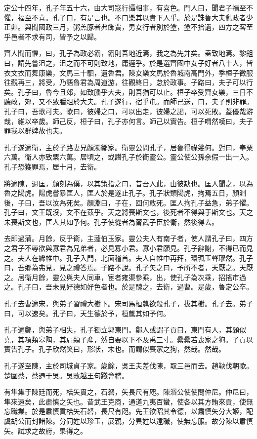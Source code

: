 定公十四年，孔子年五十六，由大司寇行攝相事，有喜色。門人曰，聞君子禍至不懼，福至不喜。孔子曰，有是言也。不曰樂其以貴下人乎。於是誅魯大夫亂政者少正卯。與聞國政三月，粥羔豚者弗飾賈，男女行者別於塗，塗不拾遺，四方之客至乎邑者不求有司，皆予之以歸。

齊人聞而懼，曰，孔子為政必霸，霸則吾地近焉，我之為先并矣。盍致地焉。黎鉏曰，請先嘗沮之，沮之而不可則致地，庸遲乎。於是選齊國中女子好者八十人，皆衣文衣而舞康樂，文馬三十駟，遺魯君。陳女樂文馬於魯城南高門外，季桓子微服往觀再三，將受，乃語魯君為周道游，往觀終日，怠於政事。子路曰，夫子可以行矣。孔子曰，魯今且郊，如致膰乎大夫，則吾猶可以止。桓子卒受齊女樂，三日不聽政，郊，又不致膰俎於大夫。孔子遂行，宿乎屯。而師己送，曰，夫子則非罪。孔子曰，吾歌可夫。歌曰，彼婦之口，可以出走，彼婦之謁，可以死敗。蓋優哉游哉，維以卒歲。師己反，桓子曰，孔子亦何言。師己以實告。桓子喟然嘆曰，夫子罪我以群婢故也夫。

孔子遂適衛，主於子路妻兄顏濁鄒家。衛靈公問孔子，居魯得祿幾何。對曰，奉粟六萬。衛人亦致粟六萬。居頃之，或譖孔子於衛靈公。靈公使公孫余假一出一入。孔子恐獲罪焉，居十月，去衛。

將適陳，過匡，顏刻為僕，以其策指之曰，昔吾入此，由彼缺也。匡人聞之，以為魯之陽虎。陽虎嘗暴匡人，匡人於是遂止孔子。孔子狀類陽虎，拘焉五日，顏淵後，子曰，吾以汝為死矣。顏淵曰，子在，回何敢死。匡人拘孔子益急，弟子懼。孔子曰，文王既沒，文不在茲乎。天之將喪斯文也，後死者不得與于斯文也。天之未喪斯文也，匡人其如予何。孔子使從者為甯武子臣於衛，然後得去。

去即過蒲。月餘，反乎衛，主蘧伯玉家。靈公夫人有南子者，使人謂孔子曰，四方之君子不辱欲與寡君為兄弟者，必見寡小君。寡小君願見。孔子辭謝，不得已而見之。夫人在絺帷中。孔子入門，北面稽首。夫人自帷中再拜，環珮玉聲璆然。孔子曰，吾鄉為弗見，見之禮答焉。子路不說。孔子矢之曰，予所不者，天厭之。天厭之。居衛月餘，靈公與夫人同車，宦者雍渠參乘，出，使孔子為次乘，招搖市過之。孔子曰，吾未見好德如好色者也。於是醜之，去衛，過曹。是歲，魯定公卒。

孔子去曹適宋，與弟子習禮大樹下。宋司馬桓魋欲殺孔子，拔其樹。孔子去。弟子曰，可以速矣。孔子曰，天生德於予，桓魋其如予何。

孔子適鄭，與弟子相失，孔子獨立郭東門。鄭人或謂子貢曰，東門有人，其顙似堯，其項類皋陶，其肩類子產，然自要以下不及禹三寸。纍纍若喪家之狗。子貢以實告孔子。孔子欣然笑曰，形狀，末也。而謂似喪家之狗，然哉。然哉。

孔子遂至陳，主於司城貞子家。歲餘，吳王夫差伐陳，取三邑而去。趙鞅伐朝歌。楚圍蔡，蔡遷于吳。吳敗越王句踐會稽。

有隼集于陳廷而死，楛矢貫之，石砮，矢長尺有咫。陳湣公使使問仲尼。仲尼曰，隼來遠矣，此肅慎之矢也。昔武王克商，通道九夷百蠻，使各以其方賄來貢，使無忘職業。於是肅慎貢楛矢石砮，長尺有咫。先王欲昭其令德，以肅慎矢分大姬，配虞胡公而封諸陳。分同姓以珍玉，展親，分異姓以遠職，使無忘服。故分陳以肅慎矢。試求之故府，果得之。

